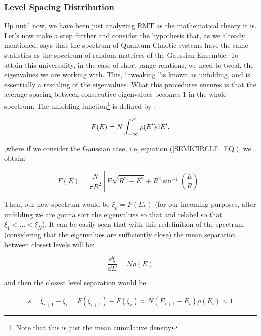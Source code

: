 \documentclass[11pt,a4paper]{article}
\begin{document}
\subsubsection{Level Spacing Distribution}

Up until now, we have been just analyzing RMT as the mathematical theory it is. Let's now make a step further and consider the hypothesis that, as we already mentioned, says that the spectrum of Quantum Chaotic systems have the same statistics as the spectrum of random matrices of the Gaussian Ensemble. To attain this universality, in the case of short range relations, we need to tweak the eigenvalues we are working with. This, \textquotedblleft tweaking \textquotedblright is known as unfolding, and is essentially a rescaling of the eigenvalues. What this procedures ensures is that the average spacing between consecutive eigenvalues becomes 1 in the whole spectrum. The unfolding function\footnote{Note that this is just the mean cumulative density} is defined by \cite{pandey_quantum_2019}:

\begin{equation}\LA{UNF_FUNC}
    F(E) = N\int_{-\infty}^E \overline{\rho}(E')\dd E',
\end{equation}

{\noindent ,where if we consider the Gaussian case, i.e, equation (\ref{SEMICIRCLE_EQ}), we obtain:}

\begin{equation}
    F(E) = \frac{N}{\pi R^2}\left[E\sqrt{R^2-E^2}+R^2\sin^{-1}\left(\frac{E}{R}\right)\right]
\end{equation}

Then, our new spectrum would be $\xi_k = F(E_k)$ (for our incoming purposes, after unfolding we are gonna sort the eigenvalues so that and relabel so that $\xi_1<...<\xi_N$). It can be easily seen that with this redefinition of the spectrum (considering that the eigenvalues are sufficiently close) the mean separation between closest levels will be:

\begin{equation}
    \frac{\dd\xi}{\dd E} = N\overline{\rho}(E) 
\end{equation}

{\noindent and then the closest level separation would be:}

\begin{equation}
    s = \xi_{i+1}-\xi_i = F(\xi_{i+1})-F(\xi_i) \approx N(E_{i+1}-E_{i})\overline{\rho}(E_i) \approx 1
\end{equation}
\end{document}
